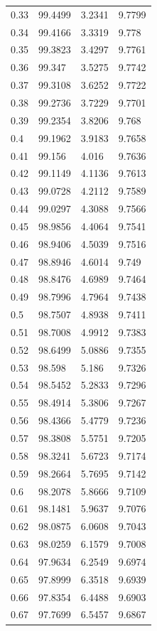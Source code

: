 \begin{tabular}{llll}
0.33 & 99.4499 & 3.2341 & 9.7799 \\
0.34 & 99.4166 & 3.3319 & 9.778 \\
0.35 & 99.3823 & 3.4297 & 9.7761 \\
0.36 & 99.347 & 3.5275 & 9.7742 \\
0.37 & 99.3108 & 3.6252 & 9.7722 \\
0.38 & 99.2736 & 3.7229 & 9.7701 \\
0.39 & 99.2354 & 3.8206 & 9.768 \\
0.4 & 99.1962 & 3.9183 & 9.7658 \\
0.41 & 99.156 & 4.016 & 9.7636 \\
0.42 & 99.1149 & 4.1136 & 9.7613 \\
0.43 & 99.0728 & 4.2112 & 9.7589 \\
0.44 & 99.0297 & 4.3088 & 9.7566 \\
0.45 & 98.9856 & 4.4064 & 9.7541 \\
0.46 & 98.9406 & 4.5039 & 9.7516 \\
0.47 & 98.8946 & 4.6014 & 9.749 \\
0.48 & 98.8476 & 4.6989 & 9.7464 \\
0.49 & 98.7996 & 4.7964 & 9.7438 \\
0.5 & 98.7507 & 4.8938 & 9.7411 \\
0.51 & 98.7008 & 4.9912 & 9.7383 \\
0.52 & 98.6499 & 5.0886 & 9.7355 \\
0.53 & 98.598 & 5.186 & 9.7326 \\
0.54 & 98.5452 & 5.2833 & 9.7296 \\
0.55 & 98.4914 & 5.3806 & 9.7267 \\
0.56 & 98.4366 & 5.4779 & 9.7236 \\
0.57 & 98.3808 & 5.5751 & 9.7205 \\
0.58 & 98.3241 & 5.6723 & 9.7174 \\
0.59 & 98.2664 & 5.7695 & 9.7142 \\
0.6 & 98.2078 & 5.8666 & 9.7109 \\
0.61 & 98.1481 & 5.9637 & 9.7076 \\
0.62 & 98.0875 & 6.0608 & 9.7043 \\
0.63 & 98.0259 & 6.1579 & 9.7008 \\
0.64 & 97.9634 & 6.2549 & 9.6974 \\
0.65 & 97.8999 & 6.3518 & 9.6939 \\
0.66 & 97.8354 & 6.4488 & 9.6903 \\
0.67 & 97.7699 & 6.5457 & 9.6867 \\

\end{tabular}
